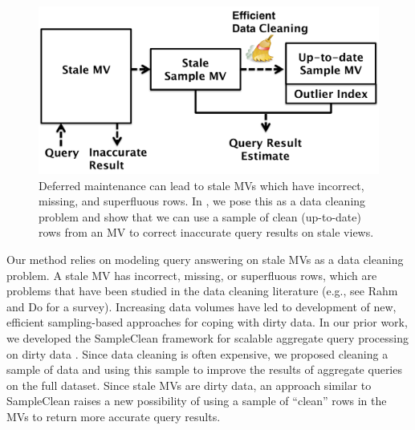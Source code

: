 
\begin{figure}[t] \vspace{-2em}
\centering
 \includegraphics[scale=0.25]{figs/sys-arch.pdf} \vspace{-.25em}
 \caption{Deferred maintenance can lead to stale MVs which have incorrect, missing, and superfluous rows. In \svc, we pose this as a data cleaning problem and show that we can use a sample of clean (up-to-date) rows from an MV to correct inaccurate query results on stale views.\label{sys-arch}}\vspace{-1.75em}
\end{figure}

Our method relies on modeling query answering on stale MVs as a data cleaning problem.
A stale MV has incorrect, missing, or superfluous rows, which are problems that have been studied in the data cleaning literature (e.g., see Rahm and Do for a survey\cite{rahm2000data}).
Increasing data volumes have led to development of new, efficient sampling-based approaches for coping with dirty data.   
In our prior work, we developed the SampleClean framework for scalable aggregate query processing on dirty data \cite{wang1999sample}.
Since data cleaning is often expensive, we proposed cleaning a sample of data and using this sample to improve the results of aggregate queries on the full dataset.
Since stale MVs are dirty data, an approach similar to SampleClean raises a new possibility of using a sample of ``clean'' rows in the MVs to return more accurate query results.


